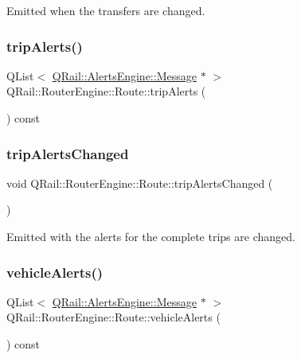 Emitted when the transfers are changed. 

\mbox{\label{classQRail_1_1RouterEngine_1_1Route_ae304c1e025a25cce45d6bbf51d0c8308}} 
\subsubsection{\texorpdfstring{tripAlerts()}{tripAlerts()}}
{\footnotesize\ttfamily Q\+List$<$ \mbox{\hyperlink{classQRail_1_1AlertsEngine_1_1Message}{Q\+Rail\+::\+Alerts\+Engine\+::\+Message}} $\ast$ $>$ Q\+Rail\+::\+Router\+Engine\+::\+Route\+::trip\+Alerts (\begin{DoxyParamCaption}{ }\end{DoxyParamCaption}) const}

\mbox{\label{classQRail_1_1RouterEngine_1_1Route_aa3aed0599caff195331cd992be3260b5}} 
\subsubsection{\texorpdfstring{tripAlertsChanged}{tripAlertsChanged}}
{\footnotesize\ttfamily void Q\+Rail\+::\+Router\+Engine\+::\+Route\+::trip\+Alerts\+Changed (\begin{DoxyParamCaption}{ }\end{DoxyParamCaption})\hspace{0.3cm}{\ttfamily [signal]}}



Emitted with the alerts for the complete trips are changed. 

\mbox{\label{classQRail_1_1RouterEngine_1_1Route_a8cc828d45bd8711e59197002f3881f90}} 
\subsubsection{\texorpdfstring{vehicleAlerts()}{vehicleAlerts()}}
{\footnotesize\ttfamily Q\+List$<$ \mbox{\hyperlink{classQRail_1_1AlertsEngine_1_1Message}{Q\+Rail\+::\+Alerts\+Engine\+::\+Message}} $\ast$ $>$ Q\+Rail\+::\+Router\+Engine\+::\+Route\+::vehicle\+Alerts (\begin{DoxyParamCaption}{ }\end{DoxyParamCaption}) const}


